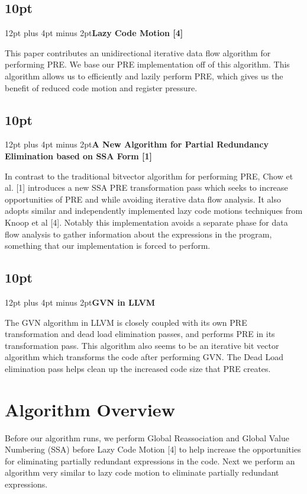 \documentclass[onecolumn,10pt]{journal}
\begin{document}
\noindent\titlespacing\subsection*{10pt}{12pt plus 4pt minus 2pt}\textbf{Lazy Code Motion [4]}

\noindent This paper contributes an unidirectional iterative data flow algorithm for performing PRE. We base our PRE implementation off of this algorithm. This algorithm allows us to efficiently and lazily perform PRE, which gives us the benefit of reduced code motion and register pressure.

\noindent\titlespacing\subsection*{10pt}{12pt plus 4pt minus 2pt}\textbf{A New Algorithm for Partial Redundancy Elimination based on SSA Form [1]}

\noindent In contrast to the traditional bitvector algorithm for performing PRE, Chow et al. [1] introduces a new SSA PRE transformation pass which seeks to increase opportunities of PRE and while avoiding iterative data flow analysis. It also adopts similar and independently implemented lazy code motions techniques from Knoop et al [4]. Notably this implementation avoids a separate phase for data flow analysis to gather information about the expressions in the program, something that our implementation is forced to perform.

\pagebreak

\noindent\titlespacing\subsection*{10pt}{12pt plus 4pt minus 2pt}\textbf{GVN in LLVM}

\noindent The GVN algorithm in LLVM is closely coupled with its own PRE transformation and dead load elimination passes, and performs PRE in its transformation pass. This algorithm also seems to be an iterative bit vector algorithm which transforms the code after performing GVN. The Dead Load elimination pass helps clean up the increased code size that PRE creates. 

\section{Algorithm Overview}

Before our algorithm runs, we perform Global Reassociation and Global Value Numbering (SSA) before Lazy Code Motion [4] to help increase the opportunities for eliminating partially redundant expressions in the code. Next we perform an algorithm very similar to lazy code motion to eliminate partially redundant expressions. 
\end{document}
